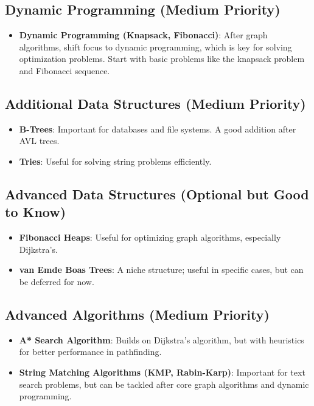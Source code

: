 \documentclass{article}
\begin{document}
\subsection{Dynamic Programming (Medium Priority)}
\begin{itemize}
    \item \textbf{Dynamic Programming (Knapsack, Fibonacci)}: After graph algorithms, shift focus to dynamic programming, which is key for solving optimization problems. Start with basic problems like the knapsack problem and Fibonacci sequence.
\end{itemize}

\subsection{Additional Data Structures (Medium Priority)}
\begin{itemize}
    \item \textbf{B-Trees}: Important for databases and file systems. A good addition after AVL trees.
    \item \textbf{Tries}: Useful for solving string problems efficiently.
\end{itemize}

\subsection{Advanced Data Structures (Optional but Good to Know)}
\begin{itemize}
    \item \textbf{Fibonacci Heaps}: Useful for optimizing graph algorithms, especially Dijkstra’s.
    \item \textbf{van Emde Boas Trees}: A niche structure; useful in specific cases, but can be deferred for now.
\end{itemize}

\subsection{Advanced Algorithms (Medium Priority)}
\begin{itemize}
    \item \textbf{A* Search Algorithm}: Builds on Dijkstra's algorithm, but with heuristics for better performance in pathfinding.
    \item \textbf{String Matching Algorithms (KMP, Rabin-Karp)}: Important for text search problems, but can be tackled after core graph algorithms and dynamic programming.
\end{itemize}
\end{document}
